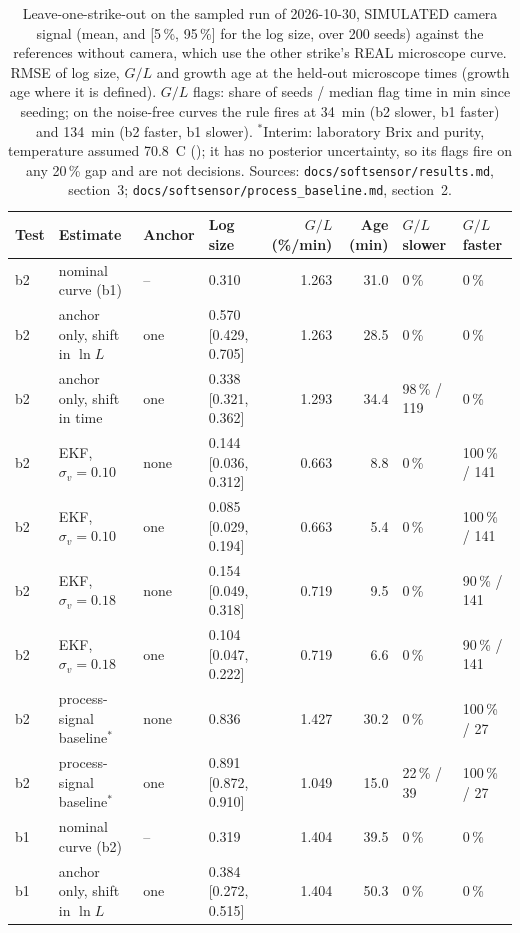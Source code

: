 \begin{table}
\centering\tabfont
\caption{Leave-one-strike-out on the sampled run of 2026-10-30, SIMULATED camera signal (mean, and [5\,\%, 95\,\%]
for the log size, over 200 seeds) against the references without camera, which use the other strike's REAL
microscope curve. RMSE of log size, $G/L$ and growth age at the held-out microscope times (growth age where it is
defined). $G/L$ flags:
share of seeds / median flag time in min since seeding; on the noise-free curves the rule fires at 34~min (b2 slower,
b1 faster) and 134~min (b2 faster, b1 slower). $^\ast$Interim: laboratory Brix and purity, temperature assumed
70.8~\textdegree C (); it has no posterior uncertainty, so its flags fire on any 20\,\% gap and
are not decisions. Sources: \texttt{docs/softsensor/results.md}, section~3;
\texttt{docs/softsensor/process\_baseline.md}, section~2.}\label{tab:loso}
\begin{tabular}{@{}llllrrll@{}}
\toprule
Test & Estimate & Anchor & Log size & $G/L$ (\%/min) & Age (min) & $G/L$ slower & $G/L$ faster \\
\midrule
b2 & nominal curve (b1) & -- & 0.310 & 1.263 & 31.0 & 0\,\% & 0\,\% \\
b2 & anchor only, shift in $\ln L$ & one & 0.570 [0.429, 0.705] & 1.263 & 28.5 & 0\,\% & 0\,\% \\
b2 & anchor only, shift in time & one & 0.338 [0.321, 0.362] & 1.293 & 34.4 & 98\,\% / 119 & 0\,\% \\
b2 & EKF, $\sigma_v = 0.10$ & none & 0.144 [0.036, 0.312] & 0.663 & 8.8 & 0\,\% & 100\,\% / 141 \\
b2 & EKF, $\sigma_v = 0.10$ & one & 0.085 [0.029, 0.194] & 0.663 & 5.4 & 0\,\% & 100\,\% / 141 \\
b2 & EKF, $\sigma_v = 0.18$ & none & 0.154 [0.049, 0.318] & 0.719 & 9.5 & 0\,\% & 90\,\% / 141 \\
b2 & EKF, $\sigma_v = 0.18$ & one & 0.104 [0.047, 0.222] & 0.719 & 6.6 & 0\,\% & 90\,\% / 141 \\
b2 & process-signal baseline$^\ast$ & none & 0.836 & 1.427 & 30.2 & 0\,\% & 100\,\% / 27 \\
b2 & process-signal baseline$^\ast$ & one & 0.891 [0.872, 0.910] & 1.049 & 15.0 & 22\,\% / 39 & 100\,\% / 27 \\
b1 & nominal curve (b2) & -- & 0.319 & 1.404 & 39.5 & 0\,\% & 0\,\% \\
b1 & anchor only, shift in $\ln L$ & one & 0.384 [0.272, 0.515] & 1.404 & 50.3 & 0\,\% & 0\,\% \\

\end{tabular}
\end{table}
